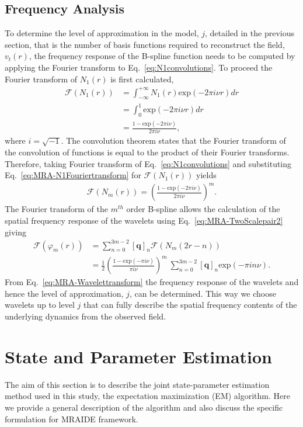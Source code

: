 \documentclass[review,authoryear,3p]{elsarticle}
\begin{document}
\subsection{Frequency Analysis}\label{sec:freq_anal}
To determine the level of approximation in the model, $j$, detailed in the previous section, that is the number of basis functions required to reconstruct the field, $v_t(r)$, the frequency response of the B-spline function needs to be computed by applying the Fourier transform to Eq.~\eqref{eq:N1convolutions}. To proceed the Fourier transform of $N_1(r)$ is first calculated, 
\begin{align}\label{eq:MRA-N1Fouriertransform}
\mathcal F(N_1(r))&=\int_{-\infty}^{+\infty}N_1(r)\mathrm{exp}(-2\pi i \nu r)dr \nonumber \\
&=\int_{0}^{1} \mathrm{exp}(-2\pi i \nu r)dr \nonumber \\
&=\frac{1-\mathrm{exp}(-2\pi i \nu)}{2\pi i\nu},
\end{align}
where $i=\sqrt{-1}$. The convolution theorem states that the Fourier transform of the convolution of functions is equal to the product of their Fourier transforms. Therefore, taking Fourier transform of Eq.~\eqref{eq:N1convolutions} and substituting Eq.~\eqref{eq:MRA-N1Fouriertransform} for $\mathcal F(N_1(r)) $ yields
\begin{align}\label{eq:MRA-NmFouriertransform}
\mathcal F(N_m(r))=\left(\frac{1-\mathrm{exp}(-2\pi i \nu)}{2\pi i\nu}\right)^{m}.
\end{align}
The Fourier transform of the $m^{th}$ order B-spline allows the calculation of the spatial frequency response of the wavelets using Eq.~\eqref{eq:MRA-TwoScalepair2} giving
\begin{align}      
	  \mathcal{F}(\varphi_{m}\left(r\right)) &= \sum_{n=0}^{3m-2} \left[\mathbf q\right]_n \mathcal{F}\left(N_{m}\left(2r-n\right)\right) \nonumber\\
	&=\frac{1}{2}\left(\frac{1-\mathrm{exp}(-\pi i \nu)}{\pi i\nu}\right)^m~\sum_{n=0}^{3m-2} \left[\mathbf q\right]_n \mathrm{exp}(-\pi in\nu).\label{eq:MRA-Wavelettransform}
\end{align}
From Eq.~\eqref{eq:MRA-Wavelettransform} the frequency response of the wavelets and hence the level of approximation, $j$, can be determined. This way we choose wavelets up to level $j$ that can fully describe the spatial frequency contents of the underlying dynamics from the observed field.

\section{State and Parameter Estimation}
The aim of this section is to describe the joint state-parameter estimation method used in this study, the expectation maximization (EM) algorithm. Here we provide a general description of the algorithm and also discuss the specific formulation for MRAIDE framework. 
\end{document}
